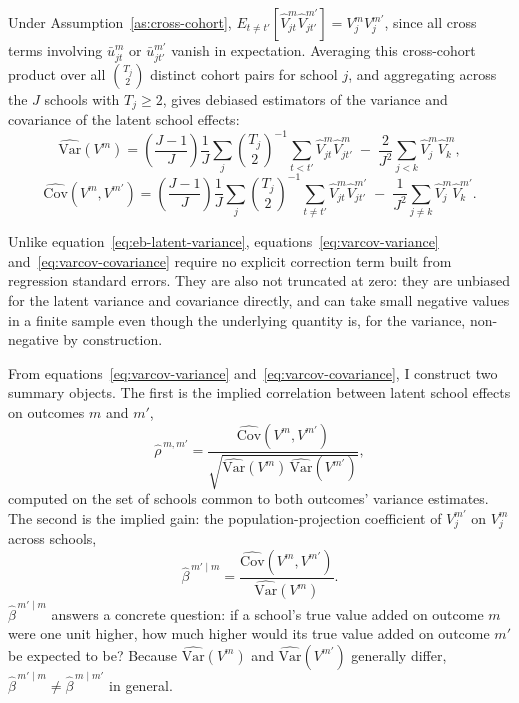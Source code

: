 \documentclass[a4paper, article, english, oneside, unknownkeysallowed, 12pt]{memoir}
\begin{document}
Under Assumption~\ref{as:cross-cohort}, $E_{t\neq t'}\left[\widehat V_{jt}^m \widehat V_{jt'}^{m'}\right] = V_j^m V_j^{m'}$, since all cross terms involving $\bar u_{jt}^m$ or $\bar u_{jt'}^{m'}$ vanish in expectation.
Averaging this cross-cohort product over all $\binom{T_j}{2}$ distinct cohort pairs for school $j$, and aggregating across the $J$ schools with $T_j\geq 2$, gives debiased estimators of the variance and covariance of the latent school effects:
\begin{equation}
  \widehat{\mathrm{Var}}\left(V^m\right) =
  \left(\frac{J-1}{J}\right)\frac{1}{J}\sum_j \binom{T_j}{2}^{-1}\sum_{t<t'} \widehat V_{jt}^m \widehat V_{jt'}^m
  \;-\; \frac{2}{J^2}\sum_{j<k} \widehat V_j^m \widehat V_k^m,
  \label{eq:varcov-variance}
\end{equation}
\begin{equation}
  \widehat{\mathrm{Cov}}\left(V^m, V^{m'}\right) =
  \left(\frac{J-1}{J}\right)\frac{1}{J}\sum_j \binom{T_j}{2}^{-1}\sum_{t\neq t'} \widehat V_{jt}^m \widehat V_{jt'}^{m'}
  \;-\; \frac{1}{J^2}\sum_{j\neq k} \widehat V_j^m \widehat V_k^{m'}.
  \label{eq:varcov-covariance}
\end{equation}

Unlike equation~\eqref{eq:eb-latent-variance}, equations~\eqref{eq:varcov-variance} and~\eqref{eq:varcov-covariance} require no explicit correction term built from regression standard errors.
They are also not truncated at zero: they are unbiased for the latent variance and covariance directly, and can take small negative values in a finite sample even though the underlying quantity is, for the variance, non-negative by construction.

From equations~\eqref{eq:varcov-variance} and~\eqref{eq:varcov-covariance}, I construct two summary objects.
The first is the implied correlation between latent school effects on outcomes $m$ and $m'$,
\begin{equation}
  \widehat\rho^{\,m,m'} = \frac{\widehat{\mathrm{Cov}}\left(V^m,V^{m'}\right)}{\sqrt{\widehat{\mathrm{Var}}(V^m)\,\widehat{\mathrm{Var}}(V^{m'})}},
  \label{eq:varcov-correlation}
\end{equation}
computed on the set of schools common to both outcomes' variance estimates.
The second is the implied gain: the population-projection coefficient of $V_j^{m'}$ on $V_j^m$ across schools,
\begin{equation}
  \widehat\beta^{\,m' \mid m} = \frac{\widehat{\mathrm{Cov}}\left(V^m,V^{m'}\right)}{\widehat{\mathrm{Var}}(V^m)}.
  \label{eq:varcov-implied-gain}
\end{equation}
$\widehat\beta^{\,m'\mid m}$ answers a concrete question: if a school's true value added on outcome $m$ were one unit higher, how much higher would its true value added on outcome $m'$ be expected to be?
Because $\widehat{\mathrm{Var}}(V^m)$ and $\widehat{\mathrm{Var}}(V^{m'})$ generally differ, $\widehat\beta^{\,m'\mid m}\neq \widehat\beta^{\,m\mid m'}$ in general.
\end{document}
